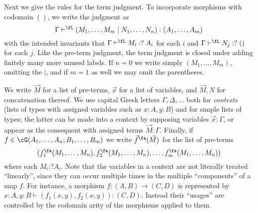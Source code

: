 \documentclass{book}
\let\types\vdash
\newcommand{\pc}{\mathrel{\mathord{:}?}}
\begin{document}
Next we give the rules for the term judgment.
To incorporate morphisms with codomain $()$, we write the judgment as
\[\Gamma \types^\fL (M_1,\dots,M_m\mid N_1,\dots,N_n):(A_1,\dots,A_m)\]
with the intended invariants that $\Gamma\types^{\fL} M_i\pc A_i$ for each $i$ and $\Gamma\types^{\fL} N_j\pc ()$ for each $j$.
Like the pre-term judgment, the term judgment is closed under adding finitely many more unused labels.
If $n=0$ we write simply $(M_1,\dots,M_m)$, omitting the $|$, and if $m=1$ as well we may omit the parentheses.

We write $\vec M$ for a list of pre-terms, $\vec{x}$ for a list of variables, and $\vec M,N$ for concatenation thereof.
We use capital Greek letters $\Gamma,\Delta,\dots$ both for \emph{contexts} (lists of types with assigned variables such as $x:A,y:B$) and for simple lists of types; the latter can be made into a context by supposing variables $\vec{x}:\Gamma$, or appear as the consequent with assigned terms $\vec{M}:\Gamma$.
Finally, if $f\in\cG(A_1,\dots,A_n;B_1,\dots,B_m)$ we write $\vec{f}^\fa(\vec{M})$ for the list of pre-terms
\[(f_1^\fa(M_1,\dots,M_n),f_2^\fa(M_1,\dots,M_n),\dots,f_m^\fa(M_1,\dots,M_n))\]
where each $M_i \pc A_i$.
Note that the variables in a context are not literally treated ``linearly'', since they can occur multiple times in the multiple ``components'' of a map $f$.
For instance, a morphism $f:(A,B)\to (C,D)$ is represented by $x:A, y:B \types (f_1(x,y),f_2(x,y)):(C,D)$.
Instead their ``usages'' are controlled by the codomain arity of the morphisms applied to them.
\end{document}
